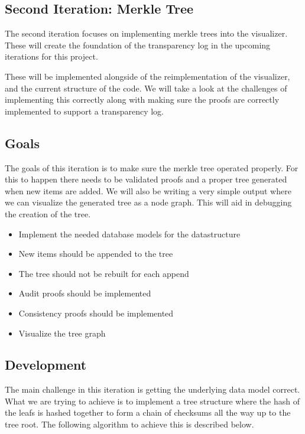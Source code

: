 \documentclass[../Main/thesis.tex]{subfiles}
\begin{document}
\subsection{Second Iteration: Merkle Tree}%
\label{sub:merkle_tree}
The second iteration focuses on implementing merkle trees into the visualizer.
These will create the foundation of the transparency log in the upcoming
iterations for this project.

These will be implemented alongside of the reimplementation of the visualizer,
and the current structure of the code. We will take a look at the challenges of
implementing this correctly along with making sure the proofs are correctly
implemented to support a transparency log.

\subsection*{Goals}%
\label{sub:second_iteration_goals}
The goals of this iteration is to make sure the merkle tree operated properly.
For this to happen there needs to be validated proofs and a proper tree
generated when new items are added. We will also be writing a very simple output
where we can visualize the generated tree as a node graph. This will aid in
debugging the creation of the tree.

\begin{itemize}
    \item Implement the needed database models for the datastructure
    \item New items should be appended to the tree
    \item The tree should not be rebuilt for each append
    \item Audit proofs should be implemented
    \item Consistency proofs should be implemented
    \item Visualize the tree graph
\end{itemize}


\subsection*{Development}%
\label{sub:second_iteration_development}
The main challenge in this iteration is getting the underlying data model
correct. What we are trying to achieve is to implement a tree structure where
the hash of the leafs is hashed together to form a chain of checksums all the
way up to the tree root. The following algorithm to achieve this is described
below.
\end{document}
